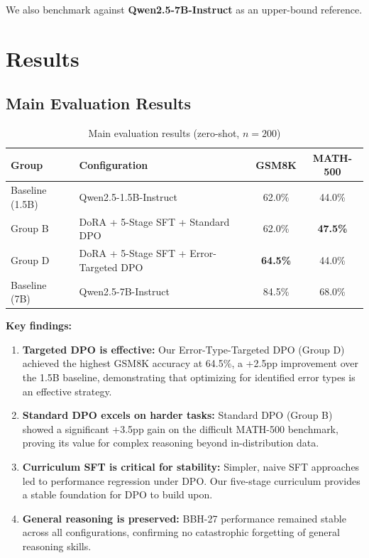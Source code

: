 \documentclass{article}
\begin{document}
We also benchmark against \textbf{Qwen2.5-7B-Instruct} as an upper-bound reference.

\section{Results}

\subsection{Main Evaluation Results}

\begin{table}[H]
\centering
\caption{Main evaluation results (zero-shot, $n=200$)}
\label{tab:main_results}
\begin{tabular}{llcc}
\toprule
\textbf{Group} & \textbf{Configuration} & \textbf{GSM8K} & \textbf{MATH-500} \\
\midrule
Baseline (1.5B) & Qwen2.5-1.5B-Instruct & 62.0\% & 44.0\% \\
Group B & DoRA + 5-Stage SFT + Standard DPO & 62.0\% & \textbf{47.5\%} \\
Group D & DoRA + 5-Stage SFT + Error-Targeted DPO & \textbf{64.5\%} & 44.0\% \\
\midrule
Baseline (7B) & Qwen2.5-7B-Instruct & 84.5\% & 68.0\% \\
\bottomrule
\end{tabular}
\end{table}

\textbf{Key findings:}
\begin{enumerate}[noitemsep]
    \item \textbf{Targeted DPO is effective:} Our Error-Type-Targeted DPO (Group D) achieved the highest GSM8K accuracy at 64.5\%, a +2.5pp improvement over the 1.5B baseline, demonstrating that optimizing for identified error types is an effective strategy.
    \item \textbf{Standard DPO excels on harder tasks:} Standard DPO (Group B) showed a significant +3.5pp gain on the difficult MATH-500 benchmark, proving its value for complex reasoning beyond in-distribution data.
    \item \textbf{Curriculum SFT is critical for stability:} Simpler, naive SFT approaches led to performance regression under DPO. Our five-stage curriculum provides a stable foundation for DPO to build upon.
    \item \textbf{General reasoning is preserved:} BBH-27 performance remained stable across all configurations, confirming no catastrophic forgetting of general reasoning skills.
\end{enumerate}
\end{document}
